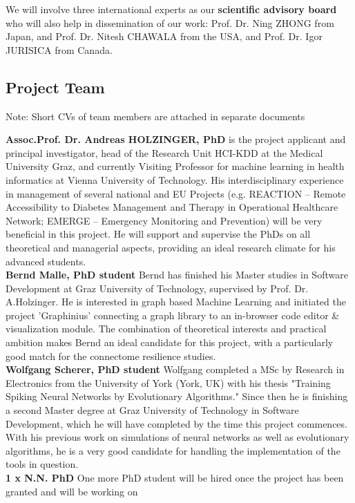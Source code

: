 \documentclass[a4paper,11pt]{article}
\begin{document}
We will involve three international experts as our \textbf{scientific advisory board} who will also help in dissemination of our work: Prof. Dr. Ning ZHONG from Japan, and Prof. Dr. Nitesh CHAWALA from the USA, and Prof. Dr. Igor JURISICA from Canada.

\subsection{Project Team}
Note: Short CVs of team members are attached in separate documents

\textbf{Assoc.Prof. Dr. Andreas HOLZINGER, PhD} is the project applicant and principal investigator, head of the Research Unit HCI-KDD at the Medical University Graz, and currently Visiting Professor for machine learning in health informatics at Vienna University of Technology. His interdisciplinary experience in management of several national and EU Projects (e.g. REACTION – Remote Accessibility to Diabetes Management and Therapy in Operational Healthcare Network; EMERGE – Emergency Monitoring and Prevention) will be very beneficial in this project. He will support and supervise the PhDs on all theoretical and managerial aspects, providing an ideal research climate for his advanced students.
\\[0,2cm]
\textbf{Bernd Malle, PhD student}
Bernd has finished his Master studies in Software Development at Graz University of Technology, supervised by Prof. Dr. A.Holzinger. He is interested in graph based Machine Learning and initiated the project 'Graphinius' connecting a graph library to an in-browser code editor \& visualization module. The combination of theoretical interests and practical ambition makes Bernd an ideal candidate for this project, with a particularly good match for the connectome resilience studies.
\\[0,2cm]
\textbf{Wolfgang Scherer, PhD student}
Wolfgang completed a MSc by Research in Electronics from the University of York (York, UK) with his thesis "Training Spiking Neural Networks by Evolutionary Algorithms." Since then he is finishing a second Master degree at Graz University of Technology in Software Development, which he will have completed by the time this project commences. With his previous work on simulations of neural networks as well as evolutionary algorithms, he is a very good candidate for handling the implementation of the tools in question.
\\[0,2cm]
\textbf{1 x N.N. PhD} One more PhD student will be hired once the project has been granted and will be working on 
\end{document}
